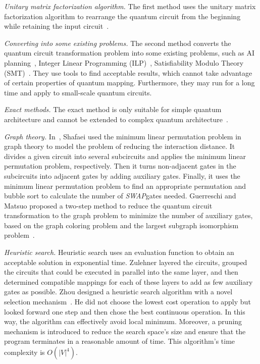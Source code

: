 \documentclass[runningheads]{llncs}
\begin{document}
\emph{Unitary matrix factorization algorithm.} The first method uses the unitary matrix factorization algorithm to rearrange the quantum circuit from the beginning while retaining the input circuit~\cite{2019CNOT,2019Quantum}.

\emph{Converting into some existing problems.} The second method converts the quantum circuit transformation problem into some existing problems, such as AI planning~\cite{2017Temporal,2018Integer}, Integer Linear Programming (ILP)~\cite{2019Almeida}, Satisfiability Modulo Theory (SMT)~\cite{2019Murali}. They use tools to find acceptable results, which cannot take advantage of certain properties of quantum mapping. Furthermore, they may run for a long time and apply to small-scale quantum circuits.

\emph{Exact methods.} 
The exact method is only suitable for simple quantum architecture and cannot be extended to complex quantum architecture~\cite{2018QubitSiraichi}.

\emph{Graph theory.} 
In~\cite{Shafaei2013}, Shafaei used the minimum linear permutation problem in graph theory to model the problem of reducing the interaction distance. It divides a given circuit into several subcircuits and applies the minimum linear permutation problem, respectively. Then it turns non-adjacent gates in the subcircuits into adjacent gates by adding auxiliary gates. Finally, it uses the minimum linear permutation problem to find an appropriate permutation and bubble sort to calculate the number of \textit{SWAP}gates needed. Guerreschi and Matsuo proposed a two-step method to reduce the quantum circuit transformation to the graph problem to minimize the number of auxiliary gates, based on the graph coloring problem and the largest subgraph isomorphism problem~\cite{Guerreschi2018,Matsuo2019}.

\emph{Heuristic search.}
Heuristic search uses an evaluation function to obtain an acceptable solution in exponential time. Zulehner layered the circuits, grouped the circuits that could be executed in parallel into the same layer, and then determined compatible mappings for each of these layers to add as few auxiliary gates as possible. Zhou designed a heuristic search algorithm with a novel selection mechanism~\cite{Xiangzhen2020}. He did not choose the lowest cost operation to apply but looked forward one step and then chose the best continuous operation. In this way, the algorithm can effectively avoid local minimum. Moreover, a pruning mechanism is introduced to reduce the search space's size and ensure that the program terminates in a reasonable amount of time. This algorithm's time complexity is $O(|V|^{4})$.
\end{document}
